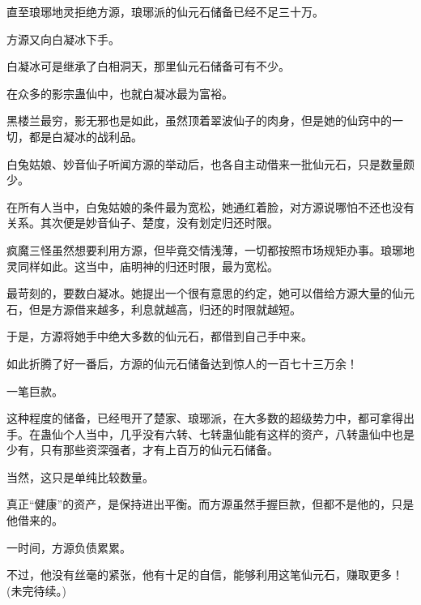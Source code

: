 \begin{this_body}
直至琅琊地灵拒绝方源，琅琊派的仙元石储备已经不足三十万。

方源又向白凝冰下手。

白凝冰可是继承了白相洞天，那里仙元石储备可有不少。

在众多的影宗蛊仙中，也就白凝冰最为富裕。

黑楼兰最穷，影无邪也是如此，虽然顶着翠波仙子的肉身，但是她的仙窍中的一切，都是白凝冰的战利品。

白兔姑娘、妙音仙子听闻方源的举动后，也各自主动借来一批仙元石，只是数量颇少。

在所有人当中，白兔姑娘的条件最为宽松，她通红着脸，对方源说哪怕不还也没有关系。其次便是妙音仙子、楚度，没有划定归还时限。

疯魔三怪虽然想要利用方源，但毕竟交情浅薄，一切都按照市场规矩办事。琅琊地灵同样如此。这当中，庙明神的归还时限，最为宽松。

最苛刻的，要数白凝冰。她提出一个很有意思的约定，她可以借给方源大量的仙元石，但是方源借来越多，利息就越高，归还的时限就越短。

于是，方源将她手中绝大多数的仙元石，都借到自己手中来。

如此折腾了好一番后，方源的仙元石储备达到惊人的一百七十三万余！

一笔巨款。

这种程度的储备，已经甩开了楚家、琅琊派，在大多数的超级势力中，都可拿得出手。在蛊仙个人当中，几乎没有六转、七转蛊仙能有这样的资产，八转蛊仙中也是少有，只有那些资深强者，才有上百万的仙元石储备。

当然，这只是单纯比较数量。

真正“健康”的资产，是保持进出平衡。而方源虽然手握巨款，但都不是他的，只是他借来的。

一时间，方源负债累累。

不过，他没有丝毫的紧张，他有十足的自信，能够利用这笔仙元石，赚取更多！(未完待续。)

\end{this_body}

